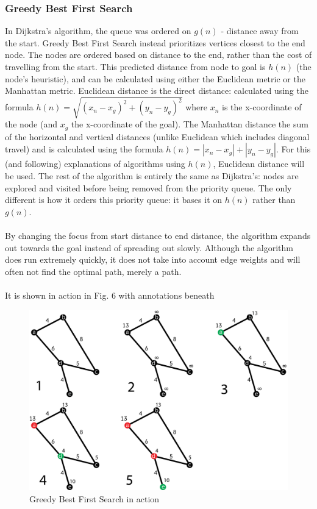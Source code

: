 \documentclass[titlepage]{article}
\begin{document}
\subsubsection{Greedy Best First Search}
In Dijkstra's algorithm, the queue was ordered on $g(n)$ - distance away from the start. Greedy Best First Search instead prioritizes vertices closest to the end node. The nodes are ordered based on distance to the end, rather than the cost of travelling from the start. This predicted distance from node to goal is $h(n)$ (the node's heuristic), and can be calculated using either the Euclidean metric or the Manhattan metric. Euclidean distance is the direct distance: calculated using the formula $h(n) = \sqrt{(x_n-x_g)^2 + (y_n-y_g)^2}$ where $x_n$ is the x-coordinate of the node (and $x_g$ the x-coordinate of the goal). The Manhattan distance the sum of the horizontal and vertical distances (unlike Euclidean which includes diagonal travel) and is calculated using the formula $h(n) =  \left|x_n-x_g\right| +  \left|y_n-y_g\right|$. For this (and following) explanations of algorithms using $h(n)$, Euclidean distance will be used. The rest of the algorithm is entirely the same as Dijkstra's: nodes are explored and visited before being removed from the priority queue. The only different is how it orders this priority queue: it bases it on $h(n)$ rather than $g(n)$. 
\\\\
By changing the focus from start distance to end distance, the algorithm expands out towards the goal instead of spreading out slowly. Although the algorithm does run extremely quickly, it does not take into account edge weights and will often not find the optimal path, merely a path. \cite{pathfindingmain}
\\\\
It is shown in action in Fig. 6 with annotations beneath
\begin{figure}[H]
  \centering
  \includegraphics[width=12cm]{bfs.png}
  \caption{Greedy Best First Search in action}
  \label{fig:bfs}
\end{figure}
\end{document}

